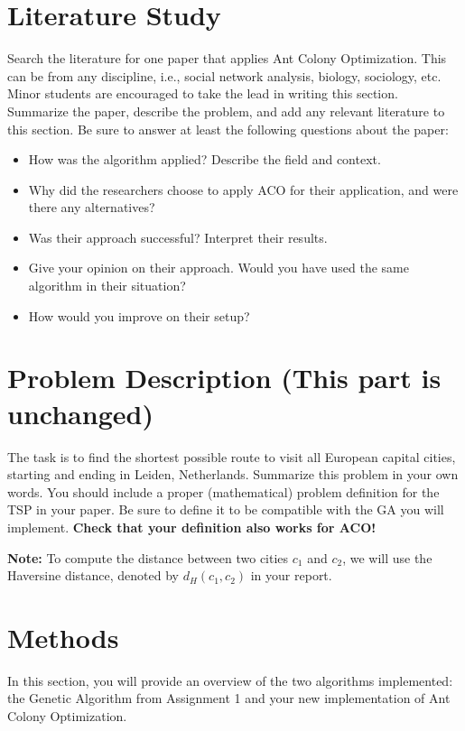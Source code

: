 \documentclass[runningheads]{llncs}
\begin{document}
\section{Literature Study}
Search the literature for one paper that applies Ant Colony Optimization. This can be from any discipline, i.e., social network analysis, biology, sociology, etc. Minor students are encouraged to take the lead in writing this section.
Summarize the paper, describe the problem, and add any relevant literature to this section. Be
sure to answer at least the following questions about the paper:
\begin{itemize}
    \item How was the algorithm applied? Describe the field and context.
    \item Why did the researchers choose to apply ACO for their application, and were there any alternatives?
    \item Was their approach successful? Interpret their results.
    \item Give your opinion on their approach. Would you have used the same algorithm in their
situation?
    \item How would you improve on their setup?
\end{itemize}

\section{Problem Description (This part is unchanged)}\label{sect:descr}
The task is to find the shortest possible route to visit all European capital cities, starting and ending in Leiden, Netherlands. Summarize this problem in your own words. You should include a proper (mathematical) problem definition for the TSP in your paper. Be sure to define it to be compatible with the GA you will implement. \textbf{Check that your definition also works for ACO!}

\textbf{Note:} To compute the distance between two cities $c_1$ and $c_2$, we will use the Haversine distance, denoted by $d_H(c_1, c_2)$ in your report. 

\section{Methods}\label{sect:impl}
In this section, you will provide an overview of the two algorithms implemented: the Genetic Algorithm from Assignment 1 and your new implementation of Ant Colony Optimization. 
\end{document}
